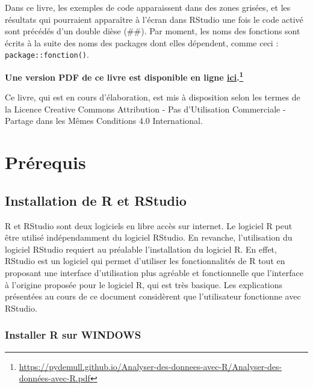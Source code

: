 \documentclass[
  french,
]{book}
\begin{document}
Dans ce livre, les exemples de code apparaissent dans des zones grisées, et les résultats qui pourraient apparaître à l'écran dans RStudio une fois le code activé sont précédés d'un double dièse (\#\#). Par moment, les noms des fonctions sont écrits à la suite des noms des packages dont elles dépendent, comme ceci : \texttt{package::fonction()}.

\textbf{Une version PDF de ce livre est disponible en ligne \href{https://pydemull.github.io/Analyser-des-donnees-avec-R/Analyser-des-données-avec-R.pdf}{ici}.\footnote{\url{https://pydemull.github.io/Analyser-des-donnees-avec-R/Analyser-des-données-avec-R.pdf}}}

Ce livre, qui est en cours d'élaboration, est mis à disposition selon les termes de la Licence Creative Commons Attribution - Pas d'Utilisation Commerciale - Partage dans les Mêmes Conditions 4.0 International.

\hypertarget{pruxe9requis}{%
\chapter{Prérequis}\label{pruxe9requis}}

\hypertarget{installation-de-r-et-rstudio}{%
\section{Installation de R et RStudio}\label{installation-de-r-et-rstudio}}

R et RStudio sont deux logiciels en libre accès sur internet. Le logiciel R peut être utilisé indépendamment du logiciel RStudio. En revanche, l'utilisation du logiciel RStudio requiert au préalable l'installation du logiciel R. En effet, RStudio est un logiciel qui permet d'utiliser les fonctionnalités de R tout en proposant une interface d'utilisation plus agréable et fonctionnelle que l'interface à l'origine proposée pour le logiciel R, qui est très basique. Les explications présentées au cours de ce document considèrent que l'utilisateur fonctionne avec RStudio.

\hypertarget{installer-r-sur-windows}{%
\subsection{Installer R sur WINDOWS}\label{installer-r-sur-windows}}
\end{document}
